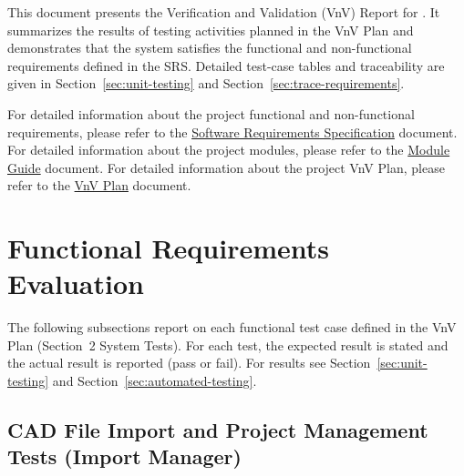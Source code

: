 \documentclass[12pt, titlepage]{article}
\begin{document}
\tableofcontents

\listoftables %

\listoffigures %

\newpage


This document presents the Verification and Validation (VnV) Report for \progname. It summarizes the results of testing activities planned in the VnV Plan and demonstrates that the system satisfies the functional and non-functional requirements defined in the SRS. Detailed test-case tables and traceability are given in Section~\ref{sec:unit-testing} and Section~\ref{sec:trace-requirements}.

\noindent For detailed information about the project functional and non-functional requirements, please refer to the \href{https://github.com/OmarHassanAdelhamid/Five-of-a-Kind-capstone-project-/blob/main/docs/SRS/SRS.pdf}{Software Requirements Specification} document. For detailed information about the project modules, please refer to the \href{https://github.com/OmarHassanAdelhamid/Five-of-a-Kind-capstone-project-/blob/main/docs/Design/SoftArchitecture/MG.pdf}{Module Guide} document. For detailed information about the project VnV Plan, please refer to the \href{https://github.com/OmarHassanAdelhamid/Five-of-a-Kind-capstone-project-/blob/main/docs/VnVPlan/VnVPlan.pdf}{VnV Plan} document.

\section{Functional Requirements Evaluation}
\label{sec:fr-eval}

The following subsections report on each functional test case defined in the VnV Plan (Section~2 System Tests). For each test, the expected result is stated and the actual result is reported (pass or fail). For results see Section~\ref{sec:unit-testing} and Section~\ref{sec:automated-testing}.

\subsection{CAD File Import and Project Management Tests (Import Manager)}
\end{document}
